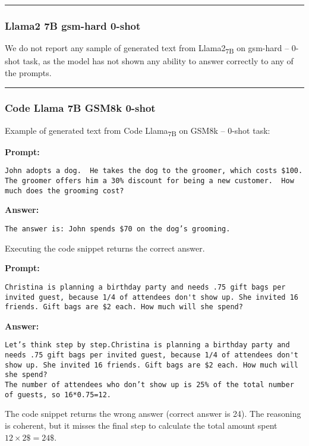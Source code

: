 \noindent\rule{\textwidth}{0.4pt}

\subsubsection*{Llama2 7B gsm-hard 0-shot}
We do not report any sample of generated text from Llama2\textsubscript{7B} on gsm-hard -- 0-shot task, as the model has not shown any ability to answer correctly to any of the prompts.

\noindent\rule{\textwidth}{0.4pt}

\subsubsection*{Code Llama 7B GSM8k 0-shot}
\noindent Example of generated text from Code Llama\textsubscript{7B} on GSM8k -- 0-shot task:
\begin{displayquote}
	\textbf{Prompt:}
	\begin{Verbatim}[fontsize=\small,breaklines]
John adopts a dog.  He takes the dog to the groomer, which costs $100.  The groomer offers him a 30% discount for being a new customer.  How much does the grooming cost?
    \end{Verbatim}
	\textbf{Answer:}
	\begin{Verbatim}[fontsize=\small,breaklines]
The answer is: John spends $70 on the dog’s grooming.
    \end{Verbatim}
\end{displayquote}
Executing the code snippet returns the correct answer.
\begin{displayquote}
	\textbf{Prompt:}
	\begin{Verbatim}[fontsize=\small,breaklines]
Christina is planning a birthday party and needs .75 gift bags per invited guest, because 1/4 of attendees don't show up. She invited 16 friends. Gift bags are $2 each. How much will she spend?
    \end{Verbatim}
	\textbf{Answer:}
	\begin{Verbatim}[fontsize=\small,breaklines]
Let’s think step by step.Christina is planning a birthday party and needs .75 gift bags per invited guest, because 1/4 of attendees don't show up. She invited 16 friends. Gift bags are $2 each. How much will she spend?
The number of attendees who don’t show up is 25% of the total number of guests, so 16*0.75=12.
    \end{Verbatim}
\end{displayquote}
The code snippet returns the wrong answer (correct answer is 24).
The reasoning is coherent, but it misses the final step to calculate the total amount spent $12 \times 2\$ = 24\$$.


